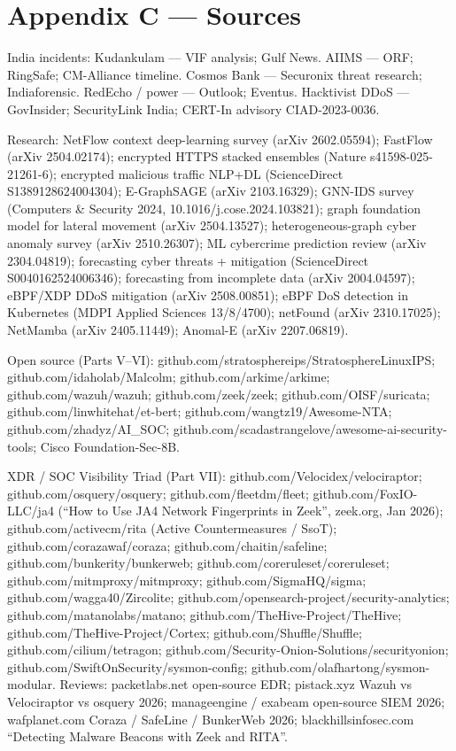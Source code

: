 \documentclass[11pt,a4paper]{article}
\begin{document}
\section*{Appendix C --- Sources}
\small
India incidents: Kudankulam --- VIF analysis; Gulf News. AIIMS --- ORF; RingSafe;
CM-Alliance timeline. Cosmos Bank --- Securonix threat research; Indiaforensic.
RedEcho / power --- Outlook; Eventus. Hacktivist DDoS --- GovInsider; SecurityLink
India; CERT-In advisory CIAD-2023-0036.

Research: NetFlow context deep-learning survey (arXiv 2602.05594); FastFlow
(arXiv 2504.02174); encrypted HTTPS stacked ensembles (Nature s41598-025-21261-6);
encrypted malicious traffic NLP+DL (ScienceDirect S1389128624004304); E-GraphSAGE
(arXiv 2103.16329); GNN-IDS survey (Computers \& Security 2024,
10.1016/j.cose.2024.103821); graph foundation model for lateral movement
(arXiv 2504.13527); heterogeneous-graph cyber anomaly survey (arXiv 2510.26307);
ML cybercrime prediction review (arXiv 2304.04819); forecasting cyber threats +
mitigation (ScienceDirect S0040162524006346); forecasting from incomplete data
(arXiv 2004.04597); eBPF/XDP DDoS mitigation (arXiv 2508.00851); eBPF DoS
detection in Kubernetes (MDPI Applied Sciences 13/8/4700); netFound
(arXiv 2310.17025); NetMamba (arXiv 2405.11449); Anomal-E (arXiv 2207.06819).

Open source (Parts V--VI): github.com/stratosphereips/StratosphereLinuxIPS;
github.com/idaholab/Malcolm; github.com/arkime/arkime; github.com/wazuh/wazuh;
github.com/zeek/zeek; github.com/OISF/suricata; github.com/linwhitehat/et-bert;
github.com/wangtz19/Awesome-NTA; github.com/zhadyz/AI\_SOC;
github.com/scadastrangelove/awesome-ai-security-tools; Cisco Foundation-Sec-8B.

XDR / SOC Visibility Triad (Part VII): github.com/Velocidex/velociraptor;
github.com/osquery/osquery; github.com/fleetdm/fleet; github.com/FoxIO-LLC/ja4
(``How to Use JA4 Network Fingerprints in Zeek'', zeek.org, Jan 2026);
github.com/activecm/rita (Active Countermeasures / SsoT); github.com/corazawaf/coraza;
github.com/chaitin/safeline; github.com/bunkerity/bunkerweb;
github.com/coreruleset/coreruleset; github.com/mitmproxy/mitmproxy;
github.com/SigmaHQ/sigma; github.com/wagga40/Zircolite;
github.com/opensearch-project/security-analytics; github.com/matanolabs/matano;
github.com/TheHive-Project/TheHive; github.com/TheHive-Project/Cortex;
github.com/Shuffle/Shuffle; github.com/cilium/tetragon;
github.com/Security-Onion-Solutions/securityonion;
github.com/SwiftOnSecurity/sysmon-config; github.com/olafhartong/sysmon-modular.
Reviews: packetlabs.net open-source EDR; pistack.xyz Wazuh vs Velociraptor vs
osquery 2026; manageengine / exabeam open-source SIEM 2026; wafplanet.com
Coraza / SafeLine / BunkerWeb 2026; blackhillsinfosec.com ``Detecting Malware
Beacons with Zeek and RITA''.
\end{document}
